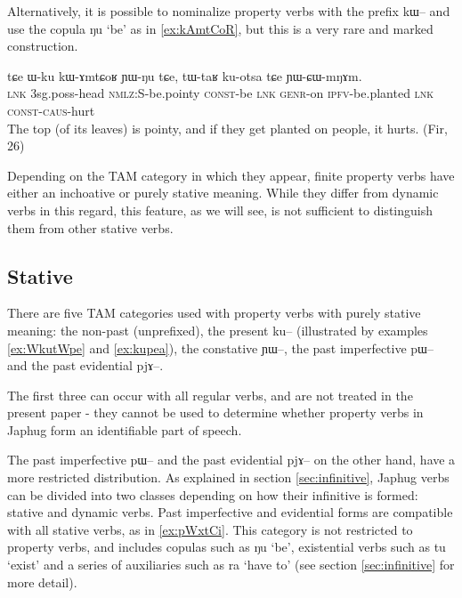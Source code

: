 \documentclass[oldfontcommands,oneside,a4paper,11pt]{article}
\newcommand{\ipa}[1]{{\phon \mbox{#1}}} %
\begin{document}
Alternatively, it is possible to nominalize   property verbs with the prefix \ipa{kɯ--} and use the copula \ipa{ŋu} `be' as in \ref{ex:kAmtCoR}, but this is a very rare and marked construction.

\begin{exe}
\ex \label{ex:kAmtCoR}
\gll
\ipa{tɕe} 	\ipa{ɯ-ku} 	\ipa{kɯ-ɤmtɕoʁ} 	\ipa{ɲɯ-ŋu} 	\ipa{tɕe,} 	\ipa{tɯ-taʁ} 	\ipa{ku-otsa} 	\ipa{tɕe} 	\ipa{ɲɯ-ɕɯ-mŋɤm.} \\
\textsc{lnk} 3sg.poss-head \textsc{nmlz:S}-be.pointy \textsc{const}-be \textsc{lnk} \textsc{genr}-on \textsc{ipfv}-be.planted \textsc{lnk} \textsc{const-caus}-hurt \\
\glt The top (of its leaves) is pointy, and if they get planted on people, it hurts.
(Fir, 26)
\end{exe}

Depending on the TAM category in which they appear, finite property verbs have either an inchoative or purely stative  meaning. While they differ from dynamic verbs in this regard, this feature, as we will see, is not sufficient to distinguish  them from other stative verbs.

\subsection{Stative} \label{sec:stative}
There are five TAM categories used with property verbs with purely stative meaning: the non-past (unprefixed), the present \ipa{ku--} (illustrated by examples 
 \ref{ex:WkutWpe} and \ref{ex:kupea}), the constative \ipa{ɲɯ--}, the past imperfective \ipa{pɯ--} and the past evidential \ipa{pjɤ--}.

The first three can occur with all regular verbs, and are not treated in the present paper - they cannot be used to determine whether property verbs in Japhug form an identifiable part of speech.

The past imperfective \ipa{pɯ--} and the past evidential \ipa{pjɤ--} on the other hand, have a more restricted distribution. As explained in section \ref{sec:infinitive}, Japhug verbs can be divided into two classes depending on how their infinitive is formed: stative and dynamic verbs. Past imperfective and evidential forms are compatible with all stative verbs, as in \ref{ex:pWxtCi}. This category is not restricted to property verbs, and includes copulas such as \ipa{ŋu} `be', existential verbs such as \ipa{tu} `exist' and a series of auxiliaries such as \ipa{ra} `have to' (see section \ref{sec:infinitive} for more detail).
\end{document}
